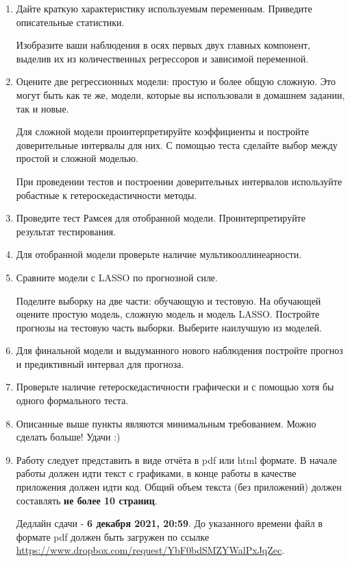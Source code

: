 \documentclass[12pt]{article}
\begin{document}
\begin{enumerate}

\item 
Дайте краткую характеристику используемым переменным. Приведите описательные статистики.

Изобразите ваши наблюдения в осях первых двух главных компонент, выделив их из количественных регрессоров и зависимой переменной. 

\item Оцените две регрессионных модели: простую и более общую сложную. Это могут быть как те же, модели, которые вы использовали в домашнем задании, так и новые.

Для сложной модели проинтерпретируйте коэффициенты и постройте доверительные интервалы для них. С помощью теста сделайте выбор между простой и сложной моделью. 

При проведении тестов и построении доверительных интервалов используйте робастные к гетероскедастичности методы.

\item Проведите тест Рамсея для отобранной модели. Проинтерпретируйте результат тестирования.

\item Для отобранной  модели проверьте наличие мультикооллинеарности.

\item Сравните модели с LASSO по прогнозной силе.

Поделите выборку на две части: обучающую и тестовую. На обучающей оцените простую модель, сложную модель и модель LASSO. Постройте прогнозы на тестовую часть выборки. Выберите наилучшую из моделей. 

\item Для финальной  модели и выдуманного нового наблюдения постройте прогноз и предиктивный интервал для прогноза.  

\item Проверьте наличие гетероскедастичности графически и с помощью хотя бы одного формального теста. 

\item Описанные выше пункты являются минимальным требованием. Можно сделать больше!  Удачи :)

\item Работу следует представить в виде отчёта в pdf или html формате. 
В начале работы должен идти текст с графиками, в конце работы в качестве приложения должен идти код. 
Общий объем текста (без приложений) должен составлять \textbf{не более 10 страниц}.


Дедлайн сдачи - \textbf{6 декабря 2021, 20:59}. До указанного времени файл в формате pdf должен быть загружен по ссылке
\url{https://www.dropbox.com/request/YbF0bdSMZYWalPxJqZec}.

\end{enumerate}
\end{document}
